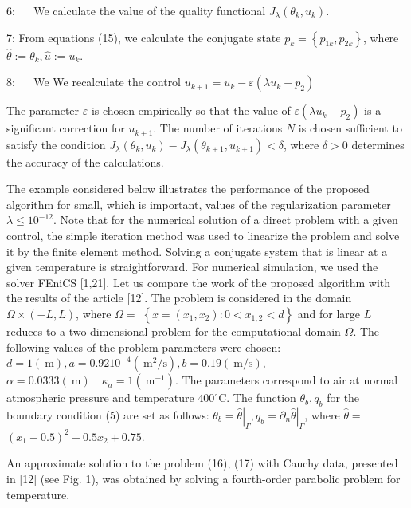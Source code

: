 6: $\quad$ We calculate the value of the quality functional $J_{\lambda}\left(\theta_{k}, u_{k}\right)$.

7: From equations (15), we calculate the conjugate state $p_{k}=\left\{p_{1 k}, p_{2 k}\right\}$, where $\widehat{\theta}:=\theta_{k}, \widehat{u}:=u_{k}$.

8: $\quad$ We We recalculate the control $u_{k+1}=u_{k}-\varepsilon\left(\lambda u_{k}-p_{2}\right)$

The parameter $\varepsilon$ is chosen empirically so that the value of $\varepsilon\left(\lambda u_{k}-p_{2}\right)$ is a significant correction for $u_{k+1}$. The number of iterations $N$ is chosen sufficient to satisfy the condition $J_{\lambda}\left(\theta_{k}, u_{k}\right)-J_{\lambda}\left(\theta_{k+1}, u_{k+1}\right)<\delta$, where $\delta>0$ determines the accuracy of the calculations.

The example considered below illustrates the performance of the proposed algorithm for small, which is important, values of the regularization parameter $\lambda \leq 10^{-12}$. Note that for the numerical solution of a direct problem with a given control, the simple iteration method was used to linearize the problem and solve it by the finite element method. Solving a conjugate system that is linear at a given temperature is straightforward. For numerical simulation, we used the solver FEniCS [1,21]. Let us compare the work of the proposed algorithm with the results of the article [12]. The problem is considered in the domain $\Omega \times(-L, L)$, where $\Omega=$ $\left\{x=\left(x_{1}, x_{2}\right): 0<x_{1,2}<d\right\}$ and for large $L$ reduces to a two-dimensional problem for the computational domain $\Omega$. The following values of the problem parameters were chosen: $d=1(\mathrm{~m}), a=0.9210^{-4}\left(\mathrm{~m}^{2} / \mathrm{s}\right), b=0.19(\mathrm{~m} / \mathrm{s})$, $\alpha=0.0333(\mathrm{~m}) \quad \kappa_{a}=1\left(\mathrm{~m}^{-1}\right)$. The parameters correspond to air at normal atmospheric pressure and temperature $400^{\circ} \mathrm{C}$. The function $\theta_{b}, q_{b}$ for the boundary condition (5) are set as follows: $\theta_{b}=\left.\widehat{\theta}\right|_{\Gamma}, q_{b}=\left.\partial_{n} \widehat{\theta}\right|_{\Gamma}$, where $\widehat{\theta}=$ $\left(x_{1}-0.5\right)^{2}-0.5 x_{2}+0.75$.

An approximate solution to the problem (16), (17) with Cauchy data, presented in [12] (see Fig. 1), was obtained by solving a fourth-order parabolic problem for temperature.

